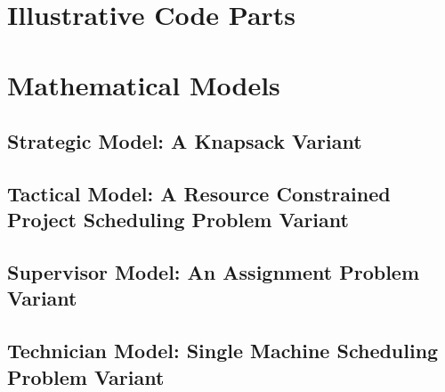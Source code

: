 \section{Illustrative Code Parts}
\section{Mathematical Models}

\newpage
\subsection{Strategic Model: A Knapsack Variant}
\label{sec:model:strategic}

\strategicmodel
\newpage
\subsection{Tactical Model: A Resource Constrained Project Scheduling Problem Variant}
\label{sec:model:tactical}

\newpage
\subsection{Supervisor Model: An Assignment Problem Variant}
\label{sec:model:supervisor}

\newpage
\subsection{Technician Model: Single Machine Scheduling Problem Variant}
\label{sec:model:technician}



